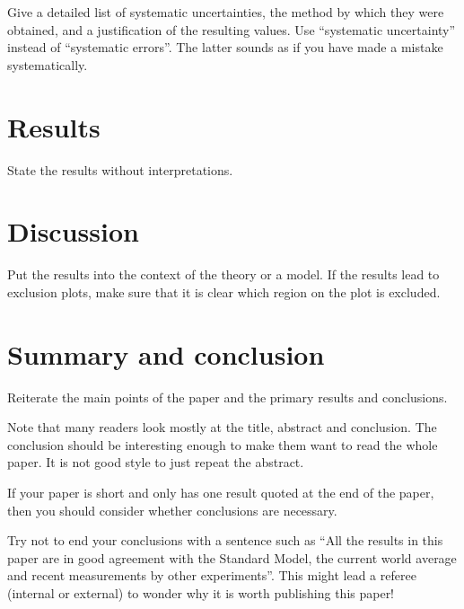 \documentclass[11pt,a4paper]{../atlasnote}
\begin{document}
Give a detailed list of systematic uncertainties, the method
by which they were obtained, and a justification of the resulting
values.
%
Use ``systematic uncertainty'' instead of ``systematic errors''.
The latter sounds as if you have made a mistake systematically.

%
%
\section{Results}

State the results without interpretations.

%
%
\section{Discussion}

Put the results into the context of the theory or a model.
%
If the results lead to exclusion plots, make sure that it is clear 
which region on the plot is excluded.

%
%
\section{Summary and conclusion}

Reiterate the main points of the paper and the primary results and
conclusions.

Note that many readers look mostly at the title, abstract and
conclusion. The conclusion should be interesting enough to
make them want to read the whole paper.
It is not good style to just repeat the abstract.

If your paper is short and only has one result quoted at the end of
the paper, then you should consider whether conclusions are
necessary. 

Try not to end your conclusions with a sentence such as
``All the results in this paper are in good agreement with the
Standard Model, the current world average and recent
measurements by other experiments''. This might lead a referee
(internal or external) to wonder why it is worth publishing this
paper!
\end{document}
